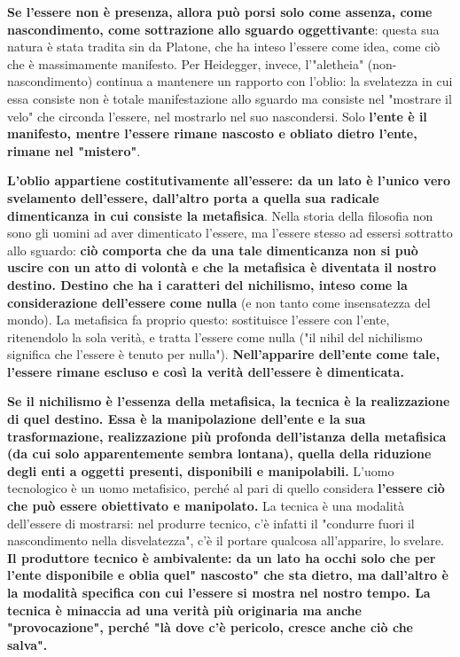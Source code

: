 \textbf{Se l'essere non è presenza, allora può porsi solo
come assenza, come nascondimento, come sottrazione
allo sguardo oggettivante}: questa sua natura è stata
tradita sin da Platone, che ha inteso l'essere
come idea, come ciò che è massimamente manifesto.
Per Heidegger, invece, l'"aletheia" (non-nascondimento)
continua a mantenere un rapporto con l'oblio: la
svelatezza in cui essa consiste non è totale
manifestazione allo sguardo ma consiste nel
"mostrare il velo" che circonda l'essere, nel
mostrarlo nel suo nascondersi. Solo \textbf{l'ente è il
manifesto, mentre l'essere rimane nascosto e
obliato dietro l'ente, rimane nel "mistero"}.

\textbf{L'oblio appartiene costitutivamente all'essere:
da un lato è l'unico vero svelamento dell'essere,
dall'altro porta a quella sua radicale dimenticanza
in cui consiste la metafisica}. Nella storia della
filosofia non sono gli uomini ad aver
dimenticato l'essere, ma l'essere stesso ad
essersi sottratto allo sguardo: \textbf{ciò comporta che da una tale dimenticanza non si può uscire
con un atto di volontà e che la metafisica
è diventata il nostro destino.
Destino che ha i caratteri del nichilismo, inteso
come la considerazione dell'essere come nulla}
(e non tanto come insensatezza del mondo). La metafisica fa proprio questo: sostituisce l'essere
con l'ente, ritenendolo la sola verità, e tratta
l'essere come nulla ("il nihil del nichilismo
significa che l'essere è tenuto per nulla").
\textbf{Nell'apparire dell'ente come tale, l'essere rimane
escluso e così la verità dell'essere è dimenticata.}

\textbf{Se il nichilismo è l'essenza della metafisica,
la tecnica è la realizzazione di quel destino.
Essa è la manipolazione dell'ente e la sua
trasformazione, realizzazione più profonda
dell'istanza della metafisica (da cui solo apparentemente sembra lontana),
quella della riduzione degli enti a oggetti presenti,
disponibili e manipolabili.}
L'uomo tecnologico è un uomo metafisico, perché al
pari di quello considera \textbf{l'essere ciò che può essere
obiettivato e manipolato.}
La tecnica è una modalità dell'essere di
mostrarsi: nel produrre tecnico, c'è infatti il
"condurre fuori il nascondimento nella disvelatezza",
c'è il portare qualcosa all'apparire, lo svelare.
\textbf{Il produttore tecnico è ambivalente: da un lato
ha occhi solo che per l'ente disponibile e oblia
quel" nascosto" che sta dietro, ma dall'altro
è la modalità specifica con cui l'essere
si mostra nel nostro tempo. La tecnica
è minaccia ad una verità più originaria
ma anche "provocazione", perché "là dove c'è
pericolo, cresce anche ciò che salva".}

